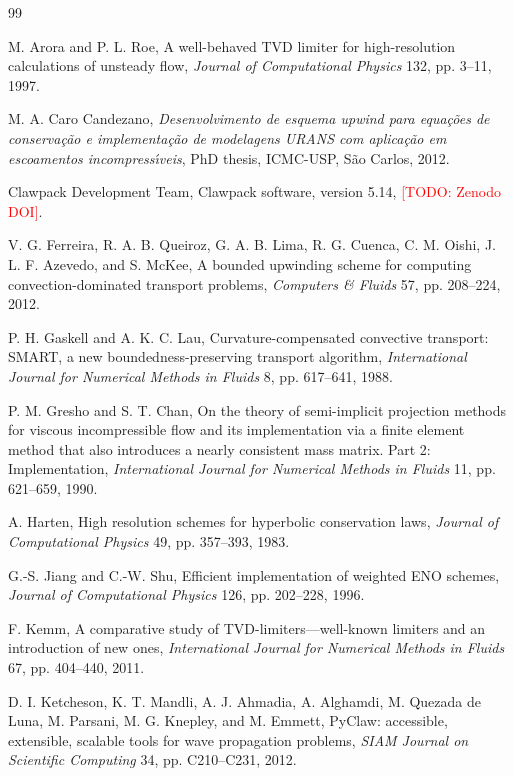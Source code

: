 \documentclass[11pt]{article}
\newcommand{\todo}[1]{\textcolor{red}{[TODO: #1]}}
\theoremstyle{plain}
\theoremstyle{definition}
\begin{document}
\begin{thebibliography}{99}

 M. Arora and P. L. Roe, A well-behaved TVD limiter for high-resolution calculations of unsteady flow, \textit{Journal of Computational Physics} 132, pp. 3--11, 1997.

 M. A. Caro Candezano, \textit{Desenvolvimento de esquema upwind para equa\c{c}\~oes de conserva\c{c}\~ao e implementa\c{c}\~ao de modelagens URANS com aplica\c{c}\~ao em escoamentos incompress\'{\i}veis}, PhD thesis, ICMC-USP, S\~ao Carlos, 2012.

 Clawpack Development Team, Clawpack software, version 5.14, \todo{Zenodo DOI}.

 V. G. Ferreira, R. A. B. Queiroz, G. A. B. Lima, R. G. Cuenca, C. M. Oishi, J. L. F. Azevedo, and S. McKee, A bounded upwinding scheme for computing convection-dominated transport problems, \textit{Computers \& Fluids} 57, pp. 208--224, 2012.

 P. H. Gaskell and A. K. C. Lau, Curvature-compensated convective transport: SMART, a new boundedness-preserving transport algorithm, \textit{International Journal for Numerical Methods in Fluids} 8, pp. 617--641, 1988.

 P. M. Gresho and S. T. Chan, On the theory of semi-implicit projection methods for viscous incompressible flow and its implementation via a finite element method that also introduces a nearly consistent mass matrix. Part 2: Implementation, \textit{International Journal for Numerical Methods in Fluids} 11, pp. 621--659, 1990.

 A. Harten, High resolution schemes for hyperbolic conservation laws, \textit{Journal of Computational Physics} 49, pp. 357--393, 1983.

 G.-S. Jiang and C.-W. Shu, Efficient implementation of weighted ENO schemes, \textit{Journal of Computational Physics} 126, pp. 202--228, 1996.

 F. Kemm, A comparative study of TVD-limiters---well-known limiters and an introduction of new ones, \textit{International Journal for Numerical Methods in Fluids} 67, pp. 404--440, 2011.

 D. I. Ketcheson, K. T. Mandli, A. J. Ahmadia, A. Alghamdi, M. Quezada de Luna, M. Parsani, M. G. Knepley, and M. Emmett, PyClaw: accessible, extensible, scalable tools for wave propagation problems, \textit{SIAM Journal on Scientific Computing} 34, pp. C210--C231, 2012.


\end{thebibliography}
\end{document}
